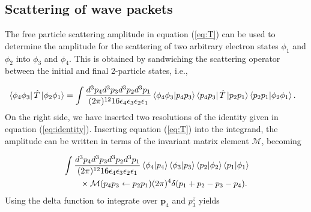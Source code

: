 \documentclass{article}
\begin{document}
\subsection{Scattering of wave packets} 
\label{sec:wavepackets}


The free particle scattering amplitude in equation (\ref{eq:T}) can be used to
determine the amplitude for the scattering of two arbitrary electron states
$\phi_1$ and $\phi_2$ into $\phi_3$ and $\phi_4$.
This is obtained by sandwiching the scattering operator between the initial and
final 2-particle states, i.e.,

\begin{equation} 
  \label{eq:amp} 
  \begin{aligned}
    &\bra{\phi_4\phi_3} \hat{T} \ket{\phi_2\phi_1}
    = 
    \int \frac{d^3p_4d^3p_3d^3p_2d^3p_1} {(2\pi)^{12}
    16\epsilon_4\epsilon_3\epsilon_2\epsilon_1}
    \bra{\phi_4\phi_3}\ket{p_4p_3} \bra{p_4p_3}\hat{T}\ket{p_2p_1}
    \bra{p_2p_1}\ket{\phi_2\phi_1}.
\end{aligned} 
\end{equation}
%
On the right side, we have inserted two resolutions of the identity given in
equation (\ref{eq:identity}). Inserting equation (\ref{eq:T}) into the
integrand, the amplitude can be written in terms of the invariant matrix
element $\mathcal{M}$, becoming

\begin{equation} 
  \label{eq:ampPlugInM} 
  \begin{aligned}
    &\int\frac{d^3p_4d^3p_3d^3p_2d^3p_1} {(2\pi)^{12}
    16\epsilon_4\epsilon_3\epsilon_2\epsilon_1} \bra{\phi_4}\ket{p_4}
    \bra{\phi_3}\ket{p_3} \bra{p_2}\ket{\phi_2} \bra{p_1}\ket{\phi_1}
    \\&\qquad\times 
    \mathcal{M}(p_4p_3\leftarrow p_2p_1) 
    (2\pi)^4\delta(p_1 + p_2 - p_3 - p_4).  
\end{aligned} 
\end{equation}
%
Using the delta function to integrate over $\mathbf{p}_4$ and $p_3^z$ yields
\end{document}
